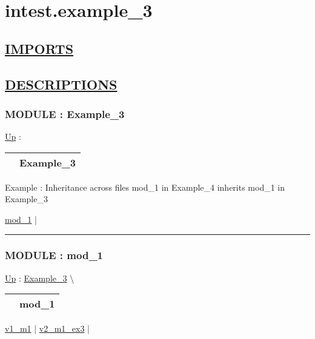 \chapter*{intest.example\_3}
\hypertarget{ecldoc:toc:intest.example_3}{}

\section*{\underline{IMPORTS}}

\section*{\underline{DESCRIPTIONS}}
\subsection*{MODULE : Example\_3}
\hypertarget{ecldoc:intest.Example_3}{}
\hyperlink{ecldoc:toc:intest}{Up} :

{\renewcommand{\arraystretch}{1.5}
\begin{tabularx}{\textwidth}{|>{\raggedright\arraybackslash}l|X|}
\hline
\hspace{0pt} & Example\_3 \\
\hline
\end{tabularx}
}

\par
Example : Inheritance across files mod\_1 in Example\_4 inherits mod\_1 in Example\_3


\hyperlink{ecldoc:intest.Example_3.mod_1}{mod\_1}  |

\rule{\linewidth}{0.5pt}

\subsection*{MODULE : mod\_1}
\hypertarget{ecldoc:intest.Example_3.mod_1}{}
\hyperlink{ecldoc:intest.Example_3}{Up} :
\hspace{0pt} \hyperlink{ecldoc:intest.Example_3}{Example_3} \textbackslash 

{\renewcommand{\arraystretch}{1.5}
\begin{tabularx}{\textwidth}{|>{\raggedright\arraybackslash}l|X|}
\hline
\hspace{0pt} & mod\_1 \\
\hline
\end{tabularx}
}

\par


\hyperlink{ecldoc:intest.example_3.mod_1.v1_m1}{v1\_m1}  |
\hyperlink{ecldoc:intest.example_3.mod_1.v2_m1_ex3}{v2\_m1\_ex3}  |

